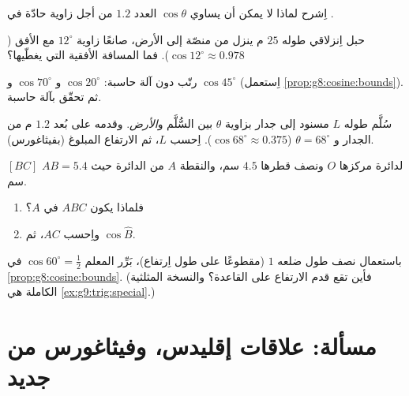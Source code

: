 \begin{exercise}[$\star$]\label{exo:g8:cosine:6}
اِشرح لماذا لا يمكن أن يساوي $\cos\theta$ العدد $1.2$ من أجل زاوية حادّة
في .
\end{exercise}

\begin{exercise}[$\star\star$]\label{exo:g8:cosine:7}
حبل اِنزلاقي طوله $25$ م ينزل من منصّة إلى الأرض، صانعًا
زاوية $12^\circ$ مع الأفق ($\cos 12^\circ \approx
0.978$). فما المسافة الأفقية التي يغطّيها؟
\end{exercise}

\begin{exercise}[$\star\star$]\label{exo:g8:cosine:8}
رتّب دون آلة حاسبة: $\cos 20^\circ$ و $\cos 70^\circ$ و
$\cos 45^\circ$ (اِستعمل \cref{prop:g8:cosine:bounds}). ثم تحقّق
بآلة حاسبة.
\end{exercise}

\begin{exercise}[$\star\star$]\label{exo:g8:cosine:9}
سُلَّم طوله $L$ مسنود إلى جدار بزاوية $\theta$
بين السُّلَّم و\emph{الأرض}. وقدمه على بُعد $1.2$ م من الجدار
و $\theta = 68^\circ$ ($\cos 68^\circ \approx 0.375$). اِحسب $L$،
ثم الارتفاع المبلوغ (بفيثاغورس).
\end{exercise}

\begin{exercise}[$\star\star$]\label{exo:g8:cosine:10}
 $[BC]$  لدائرة مركزها $O$ ونصف قطرها $4.5$ سم،
والنقطة $A$ من الدائرة حيث $AB = 5.4$ سم.
\begin{enumerate}
  \item فلماذا يكون $ABC$  في $A$؟
  \item واِحسب $AC$، ثم $\cos \widehat B$.
\end{enumerate}
\end{exercise}

\begin{exercise}[$\star\star\star$]\label{exo:g8:cosine:11}
باستعمال نصف  طول ضلعه $1$ (مقطوعًا على طول اِرتفاع)،
بَرِّر المعلم $\cos 60^\circ = \frac12$ في
\cref{prop:g8:cosine:bounds}. (فأين تقع قدم الارتفاع
على القاعدة؟ والنسخة المثلثية الكاملة هي
\cref{ex:g9:trig:special}.)
\end{exercise}

\section{مسألة: علاقات إقليدس، وفيثاغورس من
جديد}

